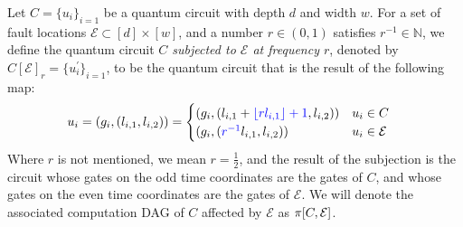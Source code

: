 \begin{definition}
  Let $C = \{ u_{i} \}_{i=1}$ be a quantum circuit with depth $d$ and width $w$. For a set of fault locations $\mathcal{E} \subset [d] \times [w]$, and a number $r \in (0,1)$ satisfies $r^{-1} \in \mathbb{N}$, we define the quantum circuit \textit{$C$ subjected to $\mathcal{E}$ at frequency $r$}, denoted by $C[\mathcal{E}]_{r} = \{ u^{\prime}_{i} \}_{i=1}$, to be the quantum circuit that is the result of the following map:
  \begin{equation*}
    \begin{split}
      u_{i}=(g_{i},(l_{i,1}, l_{i,2})) & =
      \begin{cases}
        (g_{i},(  l_{i,1} + \inb{ \lfloor r  l_{i,1} \rfloor + 1 }, l_{i,2})) & u_{i} \in C \\ 
        (g_{i},( \inb{r^{-1}} l_{i,1}, l_{i,2})) & u_{i} \in \mathcal{E}
      \end{cases}
    \end{split}
  \end{equation*} 
Where $r$ is not mentioned, we mean $r = \frac{1}{2}$, and the result of the subjection is the circuit whose gates on the odd time coordinates are the gates of $C$, and whose gates on the even time coordinates are the gates of $\mathcal{E}$. We will denote the associated computation DAG of $C$ affected by $\mathcal{E}$ as $\pi[C,\mathcal{E}]$.
\end{definition}

